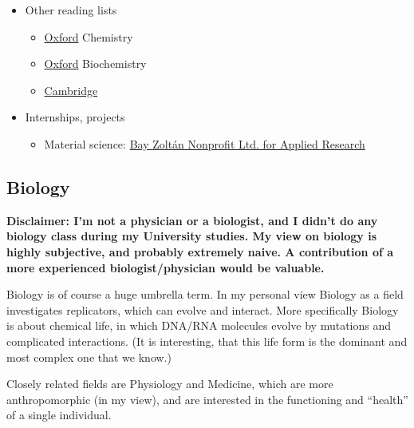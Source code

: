 \documentclass{article}
\begin{document}
\begin{itemize}
    \item Other reading lists
    \begin{itemize}
        \item \href{http://www.ox.ac.uk/sites/files/oxford/media_wysiwyg/Introductory_reading_for_Chemistry.pdf}{Oxford} Chemistry
        \item \href{https://www.bioch.ox.ac.uk/recommended-reading-list}{Oxford} Biochemistry
        \item \href{https://www.natsci.tripos.cam.ac.uk/prospective-students/reading}{Cambridge}
    \end{itemize}
    
    \item Internships, projects
    \begin{itemize}
        \item Material science: \href{https://www.bayzoltan.hu/en/home/}{Bay Zoltán Nonprofit Ltd. for Applied Research}
    \end{itemize}
    
\end{itemize}


\subsection{Biology}

\textbf{Disclaimer: I'm not a physician or a biologist, and I didn't do any biology class during my University studies. My view on biology is highly subjective, and probably extremely naive. A contribution of a more experienced biologist/physician would be valuable.}

Biology is of course a huge umbrella term. In my personal view Biology as a field investigates replicators, which can evolve and interact. More specifically Biology is about chemical life, in which DNA/RNA molecules evolve by mutations and complicated interactions. (It is interesting, that this life form is the dominant and most complex one that we know.)

Closely related fields are Physiology and Medicine, which are more anthropomorphic (in my view), and are interested in the functioning and ``health'' of a single individual.
\end{document}
